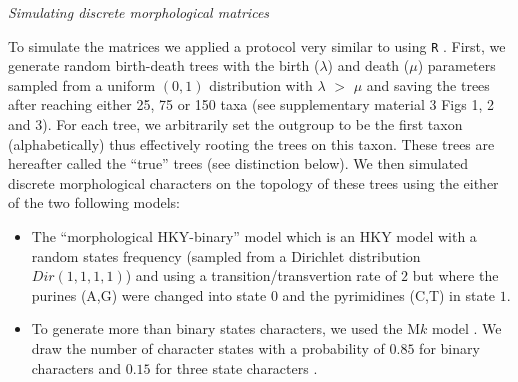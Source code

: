 \documentclass[12pt,letterpaper]{article}
\renewcommand{\subsection}[1]{%
\bigskip
\begin{center}
\begin{large}
\normalfont\itshape #1
\end{large}
\end{center}}
\begin{document}
\subsection{Simulating discrete morphological matrices}
To simulate the matrices we applied a protocol very similar to \cite{Guillerme2016146} using \texttt{R} \citep{R}.
First, we generate random birth-death trees with the birth ($\lambda$) and death ($\mu$) parameters sampled from a uniform $(0,1)$ distribution with $\lambda$ $>$ $\mu$\citep[\texttt{diversitree} v0.9-8;][]{fitzjohndiversitree2012} and saving the trees after reaching either 25, 75 or 150 taxa (see supplementary material 3 Figs 1, 2 and 3).
For each tree, we arbitrarily set the outgroup to be the first taxon (alphabetically) thus effectively rooting the trees on this taxon.
These trees are hereafter called the ``true'' trees (see distinction below).
We then simulated discrete morphological characters on the topology of these trees using the either of the two following models:
\begin{itemize}
    \item The ``morphological HKY-binary'' model \citep{OReilly20160081} which is an HKY model \citep{HKY85} with a random states frequency (sampled from a Dirichlet distribution $Dir(1,1,1,1)$) and using a transition/transvertion rate of $2$ \citep{douadycomparison2003} but where the purines (A,G) were changed into state $0$ and the pyrimidines (C,T) in state $1$.
    \item To generate more than binary states characters, we used the M$k$ model \citep{lewisa2001}.
    We draw the number of character states with a probability of $0.85$ for binary characters and $0.15$ for three state characters \citep{Guillerme2016146,ZouConvergence}.
\end{itemize}
\end{document}

